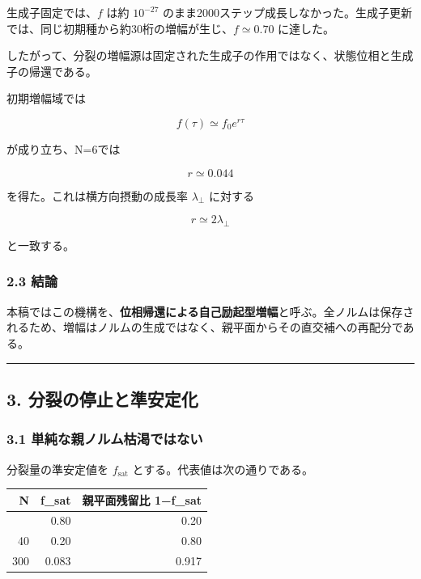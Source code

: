 \documentclass[
  a4paper,
]{ltjsarticle}
\newcounter{none} %
\begin{document}
生成子固定では、\(f\) は約 \(10^{-27}\)
のまま2000ステップ成長しなかった。生成子更新では、同じ初期種から約30桁の増幅が生じ、\(f\simeq0.70\)
に達した。

したがって、分裂の増幅源は固定された生成子の作用ではなく、状態位相と生成子の帰還である。

初期増幅域では

\[
f(\tau)\simeq f_0e^{r\tau}
\]

が成り立ち、N=6では

\[
r\simeq0.044
\]

を得た。これは横方向摂動の成長率 \(\lambda_\perp\) に対する

\[
r\simeq2\lambda_\perp
\]

と一致する。

\subsubsection{2.3 結論}\label{ux7d50ux8ad6}

本稿ではこの機構を、\textbf{位相帰還による自己励起型増幅}と呼ぶ。全ノルムは保存されるため、増幅はノルムの生成ではなく、親平面からその直交補への再配分である。

\begin{center}\rule{0.5\linewidth}{0.5pt}\end{center}

\subsection{3.
分裂の停止と準安定化}\label{ux5206ux88c2ux306eux505cux6b62ux3068ux6e96ux5b89ux5b9aux5316}

\subsubsection{3.1
単純な親ノルム枯渇ではない}\label{ux5358ux7d14ux306aux89aaux30ceux30ebux30e0ux67afux6e07ux3067ux306fux306aux3044}

分裂量の準安定値を \(f_{\mathrm{sat}}\) とする。代表値は次の通りである。

{\def\LTcaptype{none} %
\begin{longtable}[]{@{}rrr@{}}
\toprule\noalign{}
N & f\_sat & 親平面残留比 1−f\_sat \\
\midrule\noalign{}
\endhead
\bottomrule\noalign{}
\endlastfoot
5 & 0.80 & 0.20 \\
40 & 0.20 & 0.80 \\
300 & 0.083 & 0.917 \\
\end{longtable}
}
\end{document}
